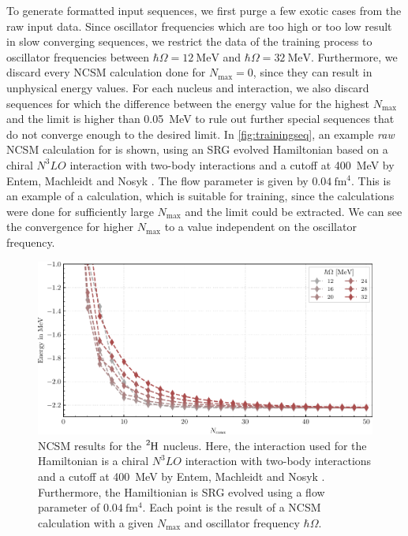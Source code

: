 To generate formatted input sequences, we first purge a few exotic cases from the raw input data. Since oscillator frequencies which are too high or too low result in slow converging sequences, we restrict the data of the training process to oscillator frequencies between $\hbar\Omega=\SI{12}{\mega\electronvolt}$ and $\hbar\Omega=\SI{32}{\mega\electronvolt}$. Furthermore, we discard every NCSM calculation done for $N_\mathrm{max} = 0$, since they can result in unphysical energy values. For each nucleus and interaction, we also discard sequences for which the difference between the energy value for the highest $N_\mathrm{max}$ and the limit is higher than \SI{0.05}{\mega\electronvolt} to rule out further special sequences that do not converge enough to the desired limit.
In \autoref{fig:trainingseq}, an example \textit{raw} NCSM calculation for  is shown, using an SRG evolved Hamiltonian based on a chiral $N^{3}LO$ interaction with two-body interactions and a cutoff at \SI{400}{\mega\electronvolt} by Entem, Machleidt and Nosyk \cite{entemmachleidt}. The flow parameter is given by $\SI{0.04}{\femto\metre^4}$. This is an example of a calculation, which is suitable for training, since the calculations were done for sufficiently large $N_\mathrm{max}$ and the limit could be extracted. We can see the convergence for higher $N_\mathrm{max}$ to a value independent on the oscillator frequency.

\begin{figure}[H]
  \centering
  \includegraphics{media/example_sequence.pdf}
  \caption{NCSM results for the $\n{2}{H}$ nucleus. Here, the interaction used for the Hamiltonian is a chiral $N^{3}LO$ interaction with two-body interactions and a cutoff at \SI{400}{\mega\electronvolt} by Entem, Machleidt and Nosyk \cite{entemmachleidt}. Furthermore, the Hamiltionian is SRG evolved using a flow parameter of $\SI{0.04}{\femto\metre^4}$. Each point is the result of a NCSM calculation with a given $N_\mathrm{max}$ and oscillator frequency $\hbar \Omega$.}
  \label{fig:trainingseq}
\end{figure}


